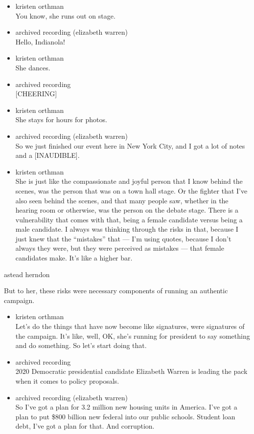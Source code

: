 \begin{itemize}
\item
  kristen orthman\\
  You know, she runs out on stage.
\item
  archived recording (elizabeth warren)\\
  Hello, Indianola!
\item
  kristen orthman\\
  She dances.
\item
  archived recording\\
  {[}CHEERING{]}
\item
  kristen orthman\\
  She stays for hours for photos.
\item
  archived recording (elizabeth warren)\\
  So we just finished our event here in New York City, and I got a lot
  of notes and a {[}INAUDIBLE{]}.
\item
  kristen orthman\\
  She is just like the compassionate and joyful person that I know
  behind the scenes, was the person that was on a town hall stage. Or
  the fighter that I've also seen behind the scenes, and that many
  people saw, whether in the hearing room or otherwise, was the person
  on the debate stage. There is a vulnerability that comes with that,
  being a female candidate versus being a male candidate. I always was
  thinking through the risks in that, because I just knew that the
  ``mistakes'' that --- I'm using quotes, because I don't always they
  were, but they were perceived as mistakes --- that female candidates
  make. It's like a higher bar.
\end{itemize}

astead herndon

But to her, these risks were necessary components of running an
authentic campaign.

\begin{itemize}
\item
  kristen orthman\\
  Let's do the things that have now become like signatures, were
  signatures of the campaign. It's like, well, OK, she's running for
  president to say something and do something. So let's start doing
  that.
\item
  archived recording\\
  2020 Democratic presidential candidate Elizabeth Warren is leading the
  pack when it comes to policy proposals.
\item
  archived recording (elizabeth warren)\\
  So I've got a plan for 3.2 million new housing units in America. I've
  got a plan to put \$800 billion new federal into our public schools.
  Student loan debt, I've got a plan for that. And corruption.
\end{itemize}

